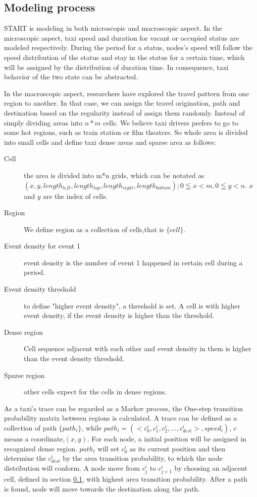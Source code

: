 \subsection{Modeling process}
\label{section_design}
START is modeling in both microscopic and macroscopic aspect. In the microscopic aspect,  taxi speed and duration for vacant or occupied status are modeled respectively. During the period for a status, nodes's speed will follow the speed distribution of the status and stay in the status for a certain time, which will be assigned by the distribution of duration time. In consequence,  taxi behavior of the two state can be abstracted.

In the macroscopic aspect, researchers \cite{HuangZhang-105} have explored the travel pattern from one region to another.
In that case, we can assign the travel origination, path and destination based on the regularity instead of assign them  randomly. Instead of simply dividing areas into $n*m$ cells. We believe taxi drivers prefers to go to some hot regions, such as train station or film theaters.
So whole area is divided into small cells and define taxi dense areas and sparse area as follows:

\begin{description}
  \item[Cell] the area is divided into m*n grids, which can be notated as $(x, y, length_{left},length_{top}, length_{right}, length_{bottom});0 \leqq x <m,0 \leqq y < n$. $x$ and $y$ are the index of cells.
  \item[Region] We define region as a collection of cells,that is $\{cell\}$.
  \item[Event density for event 1] event density is the number of event 1 happened in certain cell during a period.
  \item[Event density threshold] to define "higher event density", a threshold is set. A cell is with higher event density, if the event density is higher than the threshold.
  \item[Dense region]   Cell sequence adjacent with each other and event density in them is higher than the event density threshold.
  \item[Sparse region]  other cells expect for the cells in dense regions.

\end{description}

As a taxi's trace can be regarded as a Markov process, the One-step transition probability matrix between regions is calculated. A trace can be defined as a collection of path $\{path_i\}$, while $path_i=(<c^i_0, c^i_1, c^i_2,..., c^i_{dest}>, speed_i)$, $c$ means a coordinate,$(x,y)$.
For each node, a initial position will be assigned in recognized dense region. $path_i$ will set $c^i_0$ as its current position and then determine the $c^i_{dest}$ by the area transition probability, to which the node distribution will conform. A node move from $c^i_j$ to $c^i_{j+1}$ by choosing an adjacent cell, defined in section \ref{section_design}, with highest area transition probability. After a path is found, node will move towards the destination along the path.

